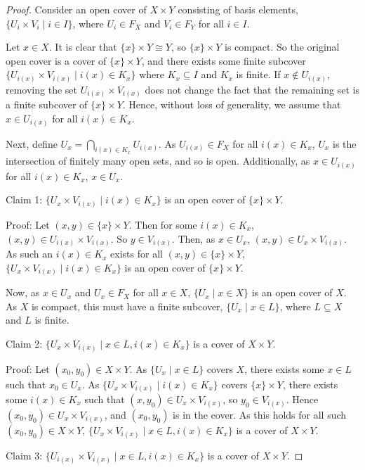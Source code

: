 \begin{proof}
Consider an open cover of $X \times Y$ consisting of basis elements, $\{U_i \times V_i \mid i \in I\}$, where $U_i \in F_X$ and $V_i \in F_Y$ for all $i \in I$.

Let $x \in X$.  It is clear that $\{x\} \times Y \cong Y$, so $\{x\} \times Y$ is compact.  So the original open cover is a cover of $\{x\} \times Y$, and there exists some finite subcover $\{U_{i(x)} \times V_{i(x)} \mid i(x) \in K_x\}$ where $K_x \subseteq I$ and $K_x$ is finite.  If $x \notin U_{i(x)}$, removing the set $U_{i(x)} \times V_{i(x)}$ does not change the fact that the remaining set is a finite subcover of $\{x\} \times Y$.  Hence, without loss of generality, we assume that $x \in U_{i(x)}$ for all $i(x) \in K_x$.

Next, define $\displaystyle{U_x = \bigcap_{i(x) \in K_x} U_{i(x)}}$.  As $U_{i(x)} \in F_X$ for all $i(x) \in K_x$, $U_x$ is the intersection of finitely many open sets, and so is open.  Additionally, as $x \in U_{i(x)}$ for all $i(x) \in K_x$, $x \in U_x$.

Claim 1: $\{U_x \times V_{i(x)} \mid i(x) \in K_x\}$ is an open cover of $\{x\} \times Y$.

Proof: Let $(x,y) \in \{x\} \times Y$.  Then for some $i(x) \in K_x$, $(x,y) \in U_{i(x)} \times V_{i(x)}$.  So $y \in V_{i(x)}$.  Then, as $x \in U_x$, $(x,y) \in U_x \times V_{i(x)}$.  As such an $i(x) \in K_x$ exists for all $(x,y) \in \{x\} \times Y$, $\{U_x \times V_{i(x)} \mid i(x) \in K_x\}$ is an open cover of $\{x\} \times Y$.

Now, as $x \in U_x$ and $U_x \in F_X$ for all $x \in X$, $\{U_x \mid x \in X\}$ is an open cover of $X$.  As $X$ is compact, this must have a finite subcover, $\{U_x \mid x \in L\}$, where $L \subseteq X$ and $L$ is finite.

Claim 2: $\{U_x \times V_{i(x)} \mid x \in L, i(x) \in K_x\}$ is a cover of $X \times Y$.

Proof: Let $(x_0,y_0) \in X \times Y$.  As $\{U_x \mid x \in L\}$ covers $X$, there exists some $x \in L$ such that $x_0 \in U_x$.  As $\{U_x \times V_{i(x)} \mid i(x) \in K_x\}$ covers $\{x\} \times Y$, there exists some $i(x) \in K_x$ such that $(x,y_0) \in U_x \times V_{i(x)}$, so $y_0 \in V_{i(x)}$.  Hence $(x_0, y_0) \in U_x \times V_{i(x)}$, and $(x_0,y_0)$ is in the cover.  As this holds for all such $(x_0,y_0) \in X \times Y$, $\{U_x \times V_{i(x)} \mid x \in L, i(x) \in K_x\}$ is a cover of $X \times Y$.

Claim 3: $\{U_{i(x)} \times V_{i(x)} \mid x \in L, i(x) \in K_x\}$ is a cover of $X \times Y$.


\end{proof}
